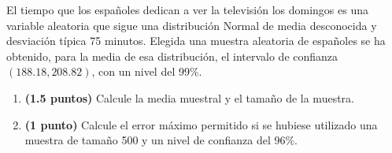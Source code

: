 
El tiempo que los españoles dedican a ver la televisión los domingos es una variable aleatoria que sigue una distribución Normal de media desconocida y desviación típica 75 minutos. Elegida una muestra aleatoria de españoles se ha obtenido, para la media de esa distribución, el intervalo de confianza $(188.18,208.82)$, con un nivel del 99\%.
\begin{enumerate}[label=\alph*)]
\item \textbf{(1.5 puntos)} Calcule la media muestral y el tamaño de la muestra.
\item \textbf{(1 punto)} Calcule el error máximo permitido si se hubiese utilizado una muestra de tamaño 500 y un nivel de confianza del 96\%.
\end{enumerate}

